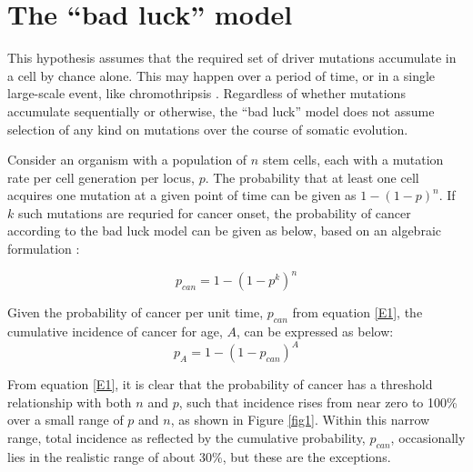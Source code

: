 \documentclass[10pt,twocolumn,twoside]{article}
\begin{document}
\section{The ``bad luck'' model}

This hypothesis assumes that the required set of driver mutations accumulate in a cell by chance alone. This may happen over a period of time, or in a single large-scale event, like chromothripsis \cite{Stephens2011}. Regardless of whether mutations accumulate sequentially or otherwise, the ``bad luck'' model does not assume selection of any kind on mutations over the course of somatic evolution.

Consider an organism with a population of $n$ stem cells, each with a mutation rate per cell generation per locus, $p$. The probability that at least one cell acquires one mutation at a given point of time can be given as $1-(1-p)^{n}$. If $k$ such mutations are requried for cancer onset, the probability of cancer according to the bad luck model can be given as below, based on an algebraic formulation \cite{Calabrese2010}:

\begin{equation}
	\label{E1}
	p_{can} = 1-(1-p^{k})^{n}
\end{equation}

Given the probability of cancer per unit time, $p_{can}$ from equation \ref{E1}, the cumulative incidence of cancer for age, $A$, can be expressed as below:
\begin{equation}
	\label{E2}
	p_{A} = 1-(1-p_{can})^{A}
\end{equation}

From equation \ref{E1}, it is clear that the probability of cancer has a threshold relationship with both $n$ and $p$, such that incidence rises from near zero to 100\% over a small range of $p$ and $n$, as shown in Figure \ref{fig1}. Within this narrow range, total incidence as reflected by the cumulative probability, $p_{can}$, occasionally lies in the realistic range of about 30\%, but these are the exceptions.
\end{document}
